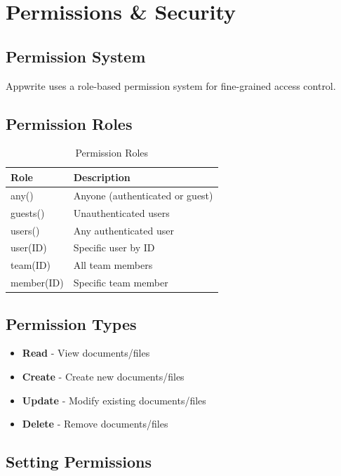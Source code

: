 \documentclass[11pt,a4paper,oneside]{book}
\begin{document}
\chapter{Permissions \& Security}

\section{Permission System}

Appwrite uses a role-based permission system for fine-grained access control.

\section{Permission Roles}

\begin{table}[h]
\centering
\begin{tabularx}{\textwidth}{l X}
\toprule
\textbf{Role} & \textbf{Description} \\
\midrule
any() & Anyone (authenticated or guest) \\
guests() & Unauthenticated users \\
users() & Any authenticated user \\
user(ID) & Specific user by ID \\
team(ID) & All team members \\
member(ID) & Specific team member \\
\bottomrule
\end{tabularx}
\caption{Permission Roles}
\end{table}

\section{Permission Types}

\begin{itemize}
    \item \textbf{Read} - View documents/files
    \item \textbf{Create} - Create new documents/files
    \item \textbf{Update} - Modify existing documents/files
    \item \textbf{Delete} - Remove documents/files
\end{itemize}

\section{Setting Permissions}
\end{document}
